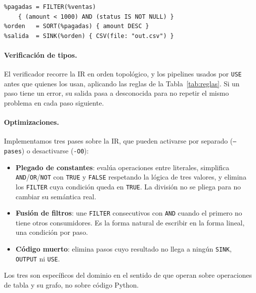 \documentclass[sigplan,screen,nonacm]{acmart}
\begin{document}
\begin{lstlisting}[language=etl,morekeywords={SOURCE,FILTER,SORT,SINK}]
%ventas  = SOURCE { CSV(file: "orders.csv") : TABLE }
%pagadas = FILTER(%ventas)
    { (amount < 1000) AND (status IS NOT NULL) }
%orden   = SORT(%pagadas) { amount DESC }
%salida  = SINK(%orden) { CSV(file: "out.csv") }
\end{lstlisting}

\paragraph{Verificación de tipos.}
El verificador recorre la IR en orden topológico, y los pipelines usados por \texttt{USE}
antes que quienes los usan, aplicando las reglas de la Tabla~\ref{tab:reglas}. Si un paso
tiene un error, su salida pasa a desconocida para no repetir el mismo problema en cada
paso siguiente.

\paragraph{Optimizaciones.}
Implementamos tres pases sobre la IR, que pueden activarse por separado
(\texttt{--pases}) o desactivarse (\texttt{-O0}):
\begin{itemize}
  \item \textbf{Plegado de constantes}: evalúa operaciones entre literales, simplifica
    \texttt{AND}/\texttt{OR}/\texttt{NOT} con \texttt{TRUE} y \texttt{FALSE} respetando la
    lógica de tres valores, y elimina los \texttt{FILTER} cuya condición queda en
    \texttt{TRUE}. La división no se pliega para no cambiar su semántica real.
  \item \textbf{Fusión de filtros}: une \texttt{FILTER} consecutivos con \texttt{AND} cuando
    el primero no tiene otros consumidores. Es la forma natural de escribir en la forma
    lineal, una condición por paso.
  \item \textbf{Código muerto}: elimina pasos cuyo resultado no llega a ningún
    \texttt{SINK}, \texttt{OUTPUT} ni \texttt{USE}.
\end{itemize}
Los tres son específicos del dominio en el sentido de que operan sobre operaciones de tabla
y su grafo, no sobre código Python.
\end{document}
